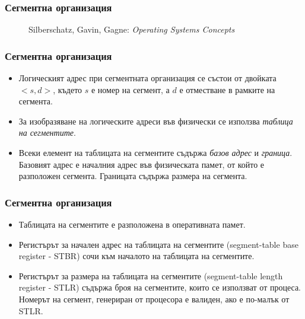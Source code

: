 \documentclass[ignorenonframetext, hyperref=unicode]{beamer}
\begin{document}
\begin{frame}
\frametitle{Сегментна организация}
\begin{figure}[h]
\center
{}
\caption{Silberschatz, Gavin, Gagne: {\em Operating Systems Concepts}}
\end{figure}
\end{frame}

\begin{frame}
\frametitle{Сегментна организация}
\begin{itemize}
  \item Логическият адрес при сегментната организация се състои от двойката
  $<s,d>$, където $s$ е номер на сегмент, а $d$ е отместване в рамките на
  сегмента.
  \item За изобразяване на логическите адреси във физически се използва
  {\em таблица на сегментите}.
  \item Всеки елемент на таблицата на сегментите съдържа {\em базов адрес} и
  {\em граница}. Базовият адрес е началния адрес във физическата памет, от
  който е разположен сегмента. Границата съдържа размера на сегмента.
\end{itemize}
\end{frame}

\begin{frame}
\frametitle{Сегментна организация}
\begin{itemize}
  \item Таблицата на сегментите е разположена в оперативната памет. 
  \item Регистърът за начален адрес на таблицата на сегментите (segment-table
  base register - STBR) сочи към началото на таблицата на сегментите.
  \item Регистърът за размера на таблицата на сегментите (segment-table
  length register - STLR) съдържа броя на сегментите, които се използват от
  процеса. Номерът на сегмент, генериран от процесора е валиден, ако е по-малък
  от STLR.
\end{itemize}
\end{frame}
\end{document}
